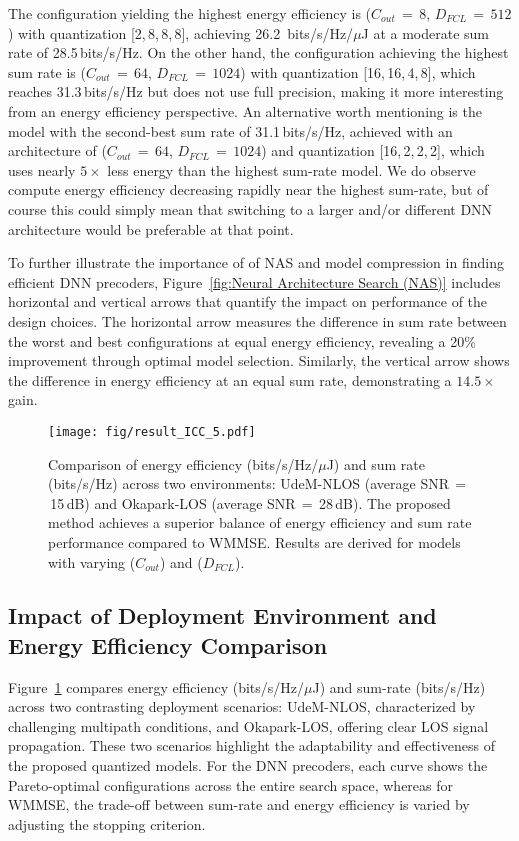 The configuration yielding the highest energy efficiency is ($C_{out}$\,$=$\,$8$, $D_{FCL}$\,$=$\,$512$) with quantization [2,\,8,\,8,\,8], achieving 26.2 \,bits/s/Hz/$\mu$J at a moderate sum rate of 28.5\,bits/s/Hz. On the other hand, the configuration achieving the highest sum rate is ($C_{out}$\,$=$\,$64$, $D_{FCL}$\,$=$\,$ 1024$) with quantization [16,\,16,\,4,\,8], which reaches 31.3\,bits/s/Hz but does not use full precision, making it more interesting from an energy efficiency perspective. An alternative worth mentioning is the model with the second-best sum rate of 31.1\,bits/s/Hz, achieved with an architecture of ($C_{out}$\,$=$\,$64$, $D_{FCL}$\,$=$\,$1024$) and quantization [16,\,2,\,2,\,2], which uses nearly $5\times$ less energy than the highest sum-rate model.
We do observe compute energy efficiency decreasing rapidly near the highest sum-rate, but of course this could simply mean that switching to a larger and/or different DNN architecture would be preferable at that point.

To further illustrate the importance of of NAS and model compression in finding efficient DNN precoders, Figure~\ref{fig:Neural Architecture Search (NAS)} includes horizontal and vertical arrows that quantify the impact on performance of the design choices. The horizontal arrow measures the difference in sum rate between the worst and best configurations at equal energy efficiency, revealing a 20\% improvement through optimal model selection. Similarly, the vertical arrow shows the difference in energy efficiency at an equal sum rate, demonstrating a $14.5\times$ gain.


\begin{figure}[!t]
\centering
\texttt{[image: fig/result\_ICC\_5.pdf]}
\caption{Comparison of energy efficiency (bits/s/Hz/$\mu$J) and sum rate (bits/s/Hz) across two environments: UdeM-NLOS (average SNR\,$=$\,15\,dB) and Okapark-LOS (average SNR\,$=$\,28\,dB). The proposed method achieves a superior balance of energy efficiency and sum rate performance compared to WMMSE. Results are derived for models with varying ($C_{out}$) and ($D_{FCL}$).}
\vspace{-9pt}
\label{fig:LSQ Quantization}
\end{figure}
\subsection{Impact of Deployment Environment and Energy Efficiency Comparison}

Figure~\ref{fig:LSQ Quantization} compares energy efficiency (bits/s/Hz/$\mu$J) and sum-rate (bits/s/Hz) across two contrasting deployment scenarios: UdeM-NLOS, characterized by challenging multipath conditions, and Okapark-LOS, offering clear \gls{LOS} signal propagation. These two scenarios highlight the adaptability and effectiveness of the proposed quantized models.
For the DNN precoders, each curve shows the Pareto-optimal configurations across the entire search space, whereas for WMMSE, the trade-off between sum-rate and energy efficiency is varied by adjusting the stopping criterion.

